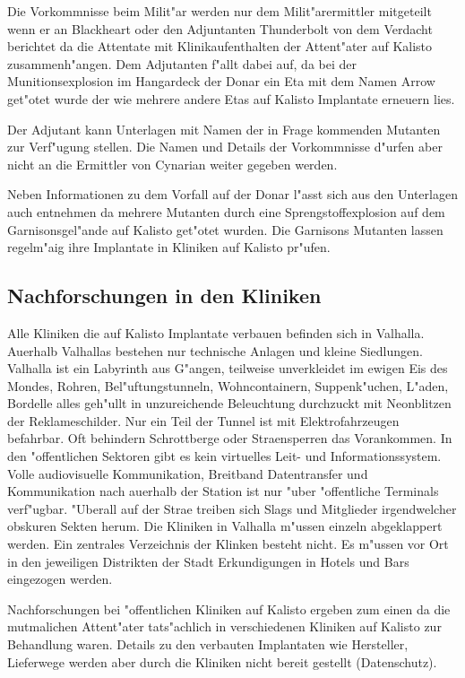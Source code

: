 Die Vorkommnisse beim Milit"ar werden nur dem Milit"arermittler mitgeteilt wenn er an Blackheart oder den Adjuntanten Thunderbolt von dem Verdacht berichtet da\3 die Attentate mit Klinikaufenthalten der Attent"ater auf Kalisto zusammenh"angen. Dem Adjutanten f"allt dabei auf, da\3 bei der Munitionsexplosion im Hangardeck der Donar ein Eta mit dem Namen Arrow get"otet wurde der wie mehrere andere Etas auf Kalisto Implantate erneuern lies.

Der Adjutant kann Unterlagen mit Namen der in Frage kommenden Mutanten zur Verf"ugung stellen. Die Namen und Details der Vorkommnisse d"urfen aber nicht an die Ermittler von Cynarian weiter gegeben werden.

Neben Informationen zu dem Vorfall auf der Donar l"asst sich aus den Unterlagen auch entnehmen da\3 mehrere Mutanten durch eine Sprengstoffexplosion auf dem Garnisonsgel"ande auf Kalisto get"otet wurden. Die Garnisons Mutanten lassen regelm"a\3ig ihre Implantate in Kliniken auf Kalisto pr"ufen.

\subsection{Nachforschungen in den Kliniken}

Alle Kliniken die auf Kalisto Implantate verbauen befinden sich in Valhalla. Au\3erhalb Valhallas bestehen nur technische Anlagen und kleine Siedlungen. Valhalla ist ein Labyrinth aus G"angen, teilweise unverkleidet im ewigen Eis des Mondes, Rohren, Bel"uftungstunneln, Wohncontainern, Suppenk"uchen, L"aden, Bordelle alles geh"ullt in unzureichende Beleuchtung durchzuckt mit Neonblitzen der Reklameschilder. Nur ein Teil der Tunnel ist mit Elektrofahrzeugen befahrbar. Oft behindern Schrottberge oder Stra\3ensperren das Vorankommen. In den "offentlichen Sektoren gibt es kein virtuelles Leit- und Informationssystem. Volle audiovisuelle Kommunikation, Breitband Datentransfer und Kommunikation nach au\3erhalb der Station ist nur "uber "offentliche Terminals verf"ugbar. "Uberall auf der Stra\3e treiben sich Slags und Mitglieder irgendwelcher obskuren Sekten herum. Die Kliniken in Valhalla m"ussen einzeln abgeklappert werden. Ein zentrales Verzeichnis der Klinken besteht nicht. Es m"ussen vor Ort in den jeweiligen Distrikten der Stadt Erkundigungen in Hotels und Bars eingezogen werden.

Nachforschungen bei "offentlichen Kliniken auf Kalisto ergeben zum einen da\3 die mutma\3lichen Attent"ater tats"achlich in verschiedenen Kliniken auf Kalisto zur Behandlung waren. Details zu den verbauten Implantaten wie Hersteller, Lieferwege werden aber durch die Kliniken nicht bereit gestellt (Datenschutz).

